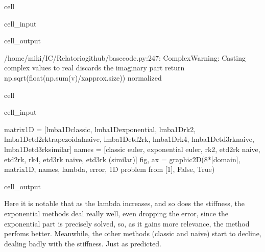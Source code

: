 \documentclass[letterpaper,10pt,english]{jupyterBook}
\begin{document}
\begin{sphinxuseclass}{cell}
\begin{sphinxVerbatimInput}
\begin{sphinxuseclass}{cell_input}
\end{sphinxuseclass}\end{sphinxVerbatimInput}
\begin{sphinxVerbatimOutput}

\begin{sphinxuseclass}{cell_output}
\begin{sphinxVerbatim}[commandchars=\\\{\}]
/home/miki/IC/Relatorio\PYGZus{}github/basecode.py:247: ComplexWarning: Casting complex values to real discards the imaginary part
  return np.sqrt(float(np.sum(v)/x\PYGZus{}approx.size)) \PYGZsh{}normalized
\end{sphinxVerbatim}

\end{sphinxuseclass}\end{sphinxVerbatimOutput}

\end{sphinxuseclass}
\begin{sphinxuseclass}{cell}\begin{sphinxVerbatimInput}

\begin{sphinxuseclass}{cell_input}
\begin{sphinxVerbatim}[commandchars=\\\{\}]
matrix\PYGZus{}1D = [lmba\PYGZus{}1D\PYGZus{}classic, lmba\PYGZus{}1D\PYGZus{}exponential, lmba\PYGZus{}1D\PYGZus{}rk2, lmba\PYGZus{}1D\PYGZus{}etd2rk\PYGZus{}trapezoidal\PYGZus{}naive, lmba\PYGZus{}1D\PYGZus{}etd2rk, lmba\PYGZus{}1D\PYGZus{}rk4, lmba\PYGZus{}1D\PYGZus{}etd3rk\PYGZus{}naive, lmba\PYGZus{}1D\PYGZus{}etd3rk\PYGZus{}similar]
names = [\PYGZsq{}classic euler\PYGZsq{}, \PYGZsq{}exponential euler\PYGZsq{}, \PYGZsq{}rk2\PYGZsq{}, \PYGZsq{}etd2rk naive\PYGZsq{}, \PYGZsq{}etd2rk\PYGZsq{}, \PYGZsq{}rk4\PYGZsq{}, \PYGZsq{}etd3rk naive\PYGZsq{}, \PYGZdq{}etd3rk (similar)\PYGZdq{}]
fig, ax = graphic\PYGZus{}2D(8*[domain], matrix\PYGZus{}1D, names, \PYGZdq{}lambda\PYGZdq{}, \PYGZdq{}error\PYGZdq{}, \PYGZdq{}1D problem from [1]\PYGZdq{}, False, True)
\end{sphinxVerbatim}

\end{sphinxuseclass}\end{sphinxVerbatimInput}
\begin{sphinxVerbatimOutput}

\begin{sphinxuseclass}{cell_output}
\noindent{}

\end{sphinxuseclass}\end{sphinxVerbatimOutput}

\end{sphinxuseclass}
\sphinxAtStartPar
Here it is notable that as the lambda increases, and so does the stiffness, the exponential methods deal really well, even dropping the error, since the exponential part is precisely solved, so, as it gains more relevance, the method perfoms better. Meanwhile, the other methods (classic and naive) start to decline, dealing badly with the stiffness. Just as predicted.
\end{document}
